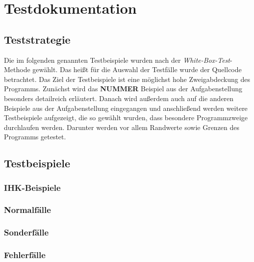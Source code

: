 \chapter{Testdokumentation}
\label{Testdokumentation}


\section{Teststrategie}
Die im folgenden genannten Testbeispiele wurden nach der \textit{White-Box-Test}-Methode gewählt. Das heißt für die Auswahl der Testfälle wurde der Quellcode betrachtet. Das Ziel der Testbeispiele ist eine möglichst hohe Zweigabdeckung des Programms.
Zunächst wird das \textbf{NUMMER} Beispiel aus der Aufgabenstellung besonders detailreich erläutert. Danach wird außerdem auch auf die anderen Beispiele aus der Aufgabenstellung eingegangen und anschließend werden weitere Testbeispiele aufgezeigt, die so gewählt wurden, dass besondere Programmzweige durchlaufen werden. Darunter werden vor allem Randwerte sowie Grenzen des Programms getestet.


\section{Testbeispiele}

\listofTests

\subsection{IHK-Beispiele}


\subsection{Normalfälle}



\subsection{Sonderfälle}



\subsection{Fehlerfälle}
